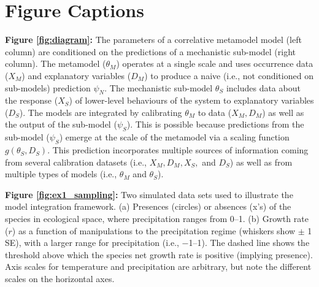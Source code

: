 \documentclass[11pt]{article}
\begin{document}
\renewcommand\refname{Literature Cited}
{}




%
%

\newpage
\section*{Figure Captions}


\begin{flushleft}

\textbf{Figure \ref{fig:diagram}:}
	The parameters of a correlative metamodel model (left column) are conditioned on the predictions of a mechanistic sub-model (right column).
	The metamodel ($\theta_M$) operates at a single scale and uses occurrence data (\(X_M\)) and explanatory variables ($D_M$) to produce a naive (i.e., not conditioned on sub-models) prediction $\psi_N$.
	The mechanistic sub-model \(\theta_S\) includes data about the response (\(X_S\)) of lower-level behaviours of the system to explanatory variables ($D_S$). 
	The models are integrated by calibrating $\theta_M$ to data ($X_M, D_M$) as well as the output of the sub-model ($\psi_S$). 
	This is possible because predictions from the sub-model ($\psi_S$) emerge at the scale of the metamodel via a scaling function \(g(\theta_S, D_S)\).
	This prediction incorporates multiple sources of information coming from several calibration datasets (i.e., $X_M, D_M, X_S, $ and $D_S$) as well as from multiple types of models (i.e., $\theta_M$ and $\theta_S$).


\textbf{Figure \ref{fig:ex1_sampling}:}
	Two simulated data sets used to illustrate the model integration framework.
	(a) Presences (circles) or absences (x's) of the species in ecological space, where precipitation ranges from 0--1.
	(b) Growth rate ($r$) as a function of manipulations to the precipitation regime (whiskers show $\pm$ 1 SE), with a larger range for precipitation (i.e., \(-\)1--1).
	The dashed line shows the threshold above which the species net growth rate is positive (implying presence).
	Axis scales for temperature and precipitation are arbitrary, but note the different scales on the horizontal axes.
	

\end{flushleft}
\end{document}
